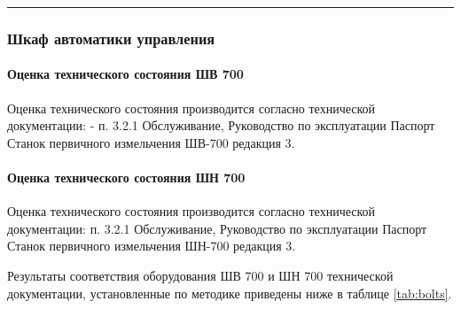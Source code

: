 \rule{145mm}{0.1 mm}

\subsubsection{Шкаф автоматики управления}



\paragraph{Оценка технического состояния ШВ 700}

Оценка технического состояния производится согласно  технической документации:
- п. 3.2.1 Обслуживание, Руководство по эксплуатации Паспорт Станок первичного измельчения ШВ-700 редакция 3.

\paragraph{Оценка технического состояния ШН 700}
Оценка технического состояния производится согласно  технической документации:
п. 3.2.1 Обслуживание, Руководство по эксплуатации Паспорт Станок первичного измельчения ШН-700 редакция 3.

Результаты соответствия оборудования ШВ 700 и ШН 700  технической документации, установленные по методике \cite{ecogold:2021}  приведены ниже в таблице \ref{tab:bolts}. 

%
%
%
%
%
%
%

